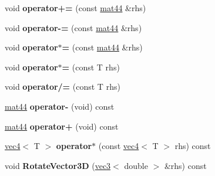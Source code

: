 \begin{DoxyCompactItemize}
\item 
\hypertarget{classmath_1_1mat44_a17307056c74a98b0663904d602b3bb43}{
void {\bfseries operator+=} (const \hyperlink{classmath_1_1mat44}{mat44} \&rhs)}
\label{classmath_1_1mat44_a17307056c74a98b0663904d602b3bb43}

\item 
\hypertarget{classmath_1_1mat44_ad6f05f63f3d4b0c357c954ad6a95473f}{
void {\bfseries operator-\/=} (const \hyperlink{classmath_1_1mat44}{mat44} \&rhs)}
\label{classmath_1_1mat44_ad6f05f63f3d4b0c357c954ad6a95473f}

\item 
\hypertarget{classmath_1_1mat44_ad148a7f58b1ddefe306871bb45b9db24}{
void {\bfseries operator$\ast$=} (const \hyperlink{classmath_1_1mat44}{mat44} \&rhs)}
\label{classmath_1_1mat44_ad148a7f58b1ddefe306871bb45b9db24}

\item 
\hypertarget{classmath_1_1mat44_a94e0057189c9ab80a4210e86b37d2450}{
void {\bfseries operator$\ast$=} (const T rhs)}
\label{classmath_1_1mat44_a94e0057189c9ab80a4210e86b37d2450}

\item 
\hypertarget{classmath_1_1mat44_ad77cac714b0e06705bf46a61527edf4e}{
void {\bfseries operator/=} (const T rhs)}
\label{classmath_1_1mat44_ad77cac714b0e06705bf46a61527edf4e}

\item 
\hypertarget{classmath_1_1mat44_a678c4c500c35a6ac7c9cbfa07544b82f}{
\hyperlink{classmath_1_1mat44}{mat44} {\bfseries operator-\/} (void) const }
\label{classmath_1_1mat44_a678c4c500c35a6ac7c9cbfa07544b82f}

\item 
\hypertarget{classmath_1_1mat44_afaa3ec8ef1b6425899cd054530152b6f}{
\hyperlink{classmath_1_1mat44}{mat44} {\bfseries operator+} (void) const }
\label{classmath_1_1mat44_afaa3ec8ef1b6425899cd054530152b6f}

\item 
\hypertarget{classmath_1_1mat44_a900b2ae1460e40680251cfff5d94b204}{
\hyperlink{classmath_1_1vec4}{vec4}$<$ T $>$ {\bfseries operator$\ast$} (const \hyperlink{classmath_1_1vec4}{vec4}$<$ T $>$ rhs) const }
\label{classmath_1_1mat44_a900b2ae1460e40680251cfff5d94b204}

\item 
\hypertarget{classmath_1_1mat44_ab9a5739e491dea7860248150e052cfc9}{
void {\bfseries RotateVector3D} (\hyperlink{classmath_1_1vec3}{vec3}$<$ double $>$ \&rhs) const }
\label{classmath_1_1mat44_ab9a5739e491dea7860248150e052cfc9}


\end{DoxyCompactItemize}
